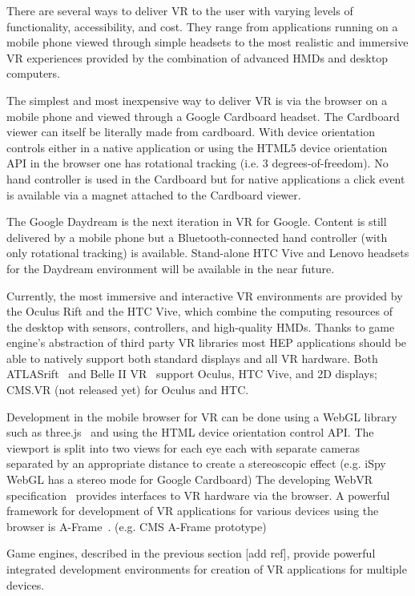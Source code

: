 \documentclass[12pt,a4paper]{article}
\begin{document}
There are several ways to deliver VR to the user with varying levels of functionality, accessibility, and cost.
They range from applications running on a mobile phone viewed through simple headsets to the most realistic and
immersive VR experiences provided by the combination of advanced HMDs and desktop computers.

The simplest and most inexpensive way to deliver VR is via the browser on a mobile phone and viewed through a
Google Cardboard headset. The Cardboard viewer can itself be literally made from cardboard. With device orientation
controls either in a native application or using the HTML5 device orientation API in the browser one has rotational
tracking (i.e. 3 degrees-of-freedom). No hand controller is used in the Cardboard but for native applications a click event
is available via a magnet attached to the Cardboard viewer.

The Google Daydream is the next iteration in VR for Google. Content is still delivered by a mobile phone but a
Bluetooth-connected hand controller (with only rotational tracking) is available. Stand-alone HTC Vive and Lenovo
headsets for the Daydream environment will be available in the near future.

Currently, the most immersive and interactive VR environments are provided by the Oculus Rift and the HTC Vive,
which combine the computing resources of the desktop with sensors, controllers, and high-quality HMDs. Thanks to
game engine’s abstraction of third party VR libraries most HEP applications should be able to natively support both
standard displays and all VR hardware. Both ATLASrift~\cite{ATLASRift} and Belle II VR~\cite{BelleIIVR} support Oculus, HTC Vive,
and 2D displays; CMS.VR (not released yet) for Oculus and HTC.

Development in the mobile browser for VR can be done using a WebGL library such as three.js~\cite{ThreeJSXXXX} and using the
HTML device orientation control API. The viewport is split into two views for each eye each with separate cameras separated
by an appropriate distance to create a stereoscopic effect (e.g. iSpy WebGL has a stereo mode for Google Cardboard)
The developing WebVR specification~\cite{WebVR} provides interfaces to VR hardware via the browser. A powerful framework for
development of VR applications for various devices using the browser is A-Frame~\cite{AFrame}. (e.g. CMS A-Frame prototype)

Game engines, described in the previous section [add ref],  provide powerful integrated development environments for creation
of VR applications for multiple devices.
\end{document}
